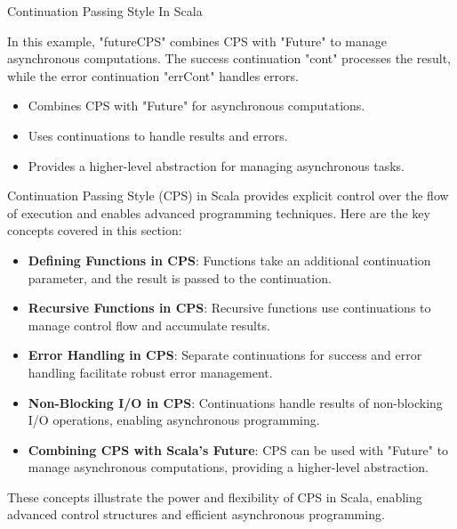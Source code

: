 \begin{notes}{Continuation Passing Style In Scala}
\begin{highlight}
        In this example, "futureCPS" combines CPS with "Future" to manage asynchronous computations. The success continuation "cont" processes the result, while the error continuation "errCont" handles errors.
    
        \begin{itemize}
            \item Combines CPS with "Future" for asynchronous computations.
            \item Uses continuations to handle results and errors.
            \item Provides a higher-level abstraction for managing asynchronous tasks.
        \end{itemize}
    
    \end{highlight}
    
    \begin{highlight}
    
        Continuation Passing Style (CPS) in Scala provides explicit control over the flow of execution and enables advanced programming techniques. Here are the key concepts covered in this section:
    
        \begin{itemize}
            \item \textbf{Defining Functions in CPS}: Functions take an additional continuation parameter, and the result is passed to the continuation.
            \item \textbf{Recursive Functions in CPS}: Recursive functions use continuations to manage control flow and accumulate results.
            \item \textbf{Error Handling in CPS}: Separate continuations for success and error handling facilitate robust error management.
            \item \textbf{Non-Blocking I/O in CPS}: Continuations handle results of non-blocking I/O operations, enabling asynchronous programming.
            \item \textbf{Combining CPS with Scala's Future}: CPS can be used with "Future" to manage asynchronous computations, providing a higher-level abstraction.
        \end{itemize}
    
        These concepts illustrate the power and flexibility of CPS in Scala, enabling advanced control structures and efficient asynchronous programming.
    
    \end{highlight}
\end{notes}

